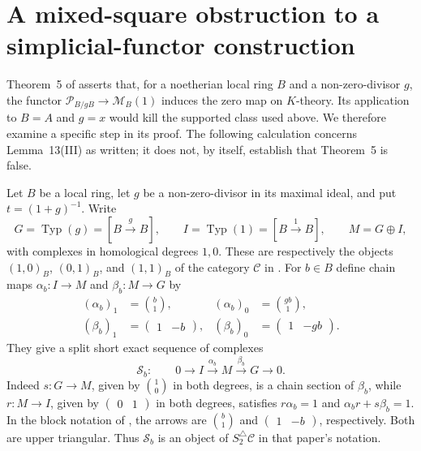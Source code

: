 \section{A mixed-square obstruction to a simplicial-functor construction}
\label{d3:sec:mochizukisquare}

Theorem~5 of \cite{MochizukiParameters} asserts that, for a noetherian
local ring $B$ and a non-zero-divisor $g$, the functor
$\mathcal P_{B/gB}\to\mathcal M_B(1)$ induces the zero map on
$K$-theory. Its application to $B=A$ and $g=x$ would kill the supported
class used above. We therefore examine a specific step in its proof.
The following calculation concerns Lemma~13(III) as written; it does
not, by itself, establish that Theorem~5 is false.

Let $B$ be a local ring, let $g$ be a non-zero-divisor in its maximal
ideal, and put $t=(1+g)^{-1}$. Write
\[
G=\operatorname{Typ}(g)=[B\xrightarrow{g}B],\qquad
I=\operatorname{Typ}(1)=[B\xrightarrow{1}B],\qquad M=G\oplus I,
\]
with complexes in homological degrees $1,0$. These are respectively
the objects $(1,0)_B$, $(0,1)_B$, and $(1,1)_B$ of the category $\mathcal C$
in \cite[Definition~9]{MochizukiParameters}. For $b\in B$ define
chain maps $\alpha_b:I\to M$ and $\beta_b:M\to G$ by
\begin{align*}
(\alpha_b)_1&=\binom{b}{1},&
(\alpha_b)_0&=\binom{gb}{1},\\
(\beta_b)_1&=\begin{pmatrix}1&-b\end{pmatrix},&
(\beta_b)_0&=\begin{pmatrix}1&-gb\end{pmatrix}.
\end{align*}
They give a split short exact sequence of complexes
\[
\mathcal S_b:\qquad 0\longrightarrow I\xrightarrow{\alpha_b}
M\xrightarrow{\beta_b}G\longrightarrow0.
\]
Indeed $s:G\to M$, given by $\binom10$ in both degrees, is a
chain section of $\beta_b$, while $r:M\to I$, given by
$\begin{pmatrix}0&1\end{pmatrix}$ in both degrees, satisfies
$r\alpha_b=1$ and $\alpha_b r+s\beta_b=1$. In the block notation
of \cite[Conventions~11]{MochizukiParameters}, the arrows are
$\binom b1$ and $\begin{pmatrix}1&-b\end{pmatrix}$, respectively.
Both are upper triangular. Thus $\mathcal S_b$ is an object of
$S_2^{\triangle}\mathcal C$ in that paper's notation.

